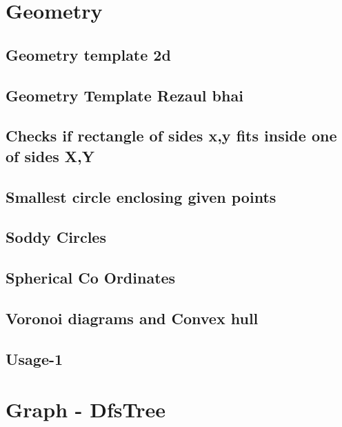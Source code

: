\section{Geometry}
\subsection{Geometry template 2d}
\raggedbottom
\hrulefill
\subsection{Geometry Template Rezaul bhai}
\raggedbottom
\hrulefill
\subsection{Checks if rectangle of sides x,y fits inside one of sides X,Y}
\raggedbottom
\hrulefill
\subsection{Smallest circle enclosing given points}
\raggedbottom
\hrulefill
\subsection{Soddy Circles}
\raggedbottom
\hrulefill
\subsection{Spherical Co Ordinates}
\raggedbottom
\hrulefill
\subsection{Voronoi diagrams and Convex hull}
\raggedbottom
\hrulefill
\subsection{Usage-1}
\raggedbottom
\hrulefill

\section{Graph - DfsTree}
